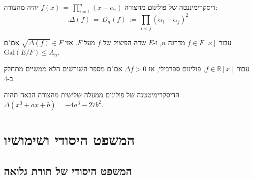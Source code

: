 \documentclass{tstextbook}
\begin{document}
\begin{definition}[דיסקרימיננטה]
דיסקרימיננטה של פולינום מהצורה \(f(x)\,=\,\prod_{i=1}^{n}(x-\alpha_{i})\) יהיה מהצורה:
$$.\Delta(f)\,=\,D_{n}(f)\,:=\,\prod_{i<j}(\alpha_{i}-\alpha_{j})^{2}$$

\end{definition}
\begin{proposition}
עבור \(f \in F[x]\) מדרגה \(n\), ו-\(E\) שדה הפיצול של \(f\) מעל \(F\). אזי \(\sqrt{ \Delta(f) } \in F\) אם"ם \(\mathrm{Gal}(E / F)\leq A_{n}\).

\end{proposition}
\begin{proposition}
עבור \(f \in \mathbb{R}[x]\), פולינום ספרבילי, אז \(\Delta f>0\) אם"ם מספר השורשים הלא ממשיים מתחלק ב-4.

\end{proposition}
\begin{proposition}
הדיסקרימיטטנה של פולינום ממעלה שלישית מהצורה הבאה תהיה \(\Delta\left(x^{3}+a x+b\right)=-4a^{3}-27b^{2}\).

\end{proposition}
\chapter{המשפט היסודי ושימושיו}

\section{המשפט היסודי של תורת גלואה}
\end{document}

